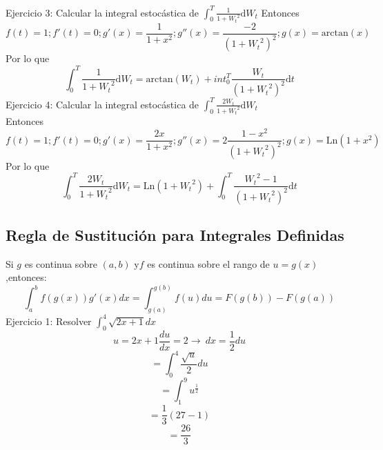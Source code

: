 \documentclass[11pt,fleqn]{book} %
\numberwithin{equation}{section} %
\numberwithin{figure}{section} %
\numberwithin{table}{section} %
\begin{document}
Ejercicio 3: Calcular la integral estocástica de $\int_0^{T} \frac{1}{1 + {W_t}^2} \mathrm{d}W_t$
Entonces 
$$    f(t)=1; f'(t)=0; g'(x) = \frac{1}{1 + {x}^2};  g''(x) = \frac{-2}{(1 + {W_t}^2)^2}; g(x) = \mathrm{arctan}(x)$$ 
Por lo que 
$$\int_0^{T} \frac{1}{1 + {W_t}^2} \mathrm{d}W_t = \mathrm{arctan}(W_t) + int_0^{T} \frac{W_t}{(1 + {W_t}^2)^2} \mathrm{d}t$$
Ejercicio 4: Calcular la integral estocástica de $ \int_0^{T} \frac{2W_t}{1 + {W_t}^2} \mathrm{d}W_t$
\ \\%
Entonces 
$$  f(t)=1; f'(t)=0; g'(x) = \frac{2 x}{1 + {x}^2};  g''(x) = 2\frac{1-x^2}{(1 + {W_t}^2)^2}; g(x) = \mathrm{Ln}(1+x^2)$$ 
Por lo que 
$$ \int_0^{T} \frac{2W_t}{1 + {W_t}^2} \mathrm{d}W_t =   \mathrm{Ln}(1+{W_t}^2) + \int_0^{T} \frac{{W_t}^2-1}{(1 + {W_t}^2)^2} \mathrm{d}t $$
\subsection{Regla de Sustitución para Integrales Definidas}
Si $g$ es continua sobre $(a,b)$ y$f$ es continua sobre el rango de $u=g(x)$,entonces:
$$\int_{a}^{b}f(g(x)){g}'(x)dx=\int_{g(a)}^{g(b)}f(u)du = F(g(b))-F(g(a))$$
Ejercicio 1: Resolver $\int_{0}^{4}\sqrt{2x+1}dx$
$$u=2x+1 \frac{du}{dx}=2\rightarrow \ dx=\frac{1}{2}du$$
$$= \int_{0}^{4}\frac{\sqrt{u}}{2}du$$
$$=\int_{1}^{9}u^\frac{1}{2}$$
$$=\frac{1}{3}(27-1)$$
$$=\frac{26}{3}$$
\end{document}
